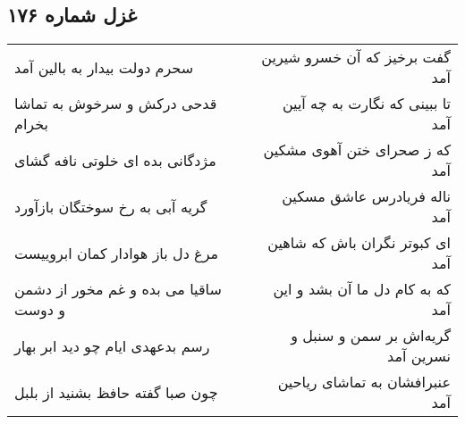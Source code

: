 \begin{center}
\section*{غزل شماره ۱۷۶}
\label{sec:sh176}
\begin{longtable}{l p{0.5cm} r}
سحرم دولت بیدار به بالین آمد
&&
گفت برخیز که آن خسرو شیرین آمد
\\
قدحی درکش و سرخوش به تماشا بخرام
&&
تا ببینی که نگارت به چه آیین آمد
\\
مژدگانی بده ای خلوتی نافه گشای
&&
که ز صحرای ختن آهوی مشکین آمد
\\
گریه آبی به رخ سوختگان بازآورد
&&
ناله فریادرس عاشق مسکین آمد
\\
مرغ دل باز هوادار کمان ابروییست
&&
ای کبوتر نگران باش که شاهین آمد
\\
ساقیا می بده و غم مخور از دشمن و دوست
&&
که به کام دل ما آن بشد و این آمد
\\
رسم بدعهدی ایام چو دید ابر بهار
&&
گریه‌اش بر سمن و سنبل و نسرین آمد
\\
چون صبا گفته حافظ بشنید از بلبل
&&
عنبرافشان به تماشای ریاحین آمد
\\
\end{longtable}
\end{center}
